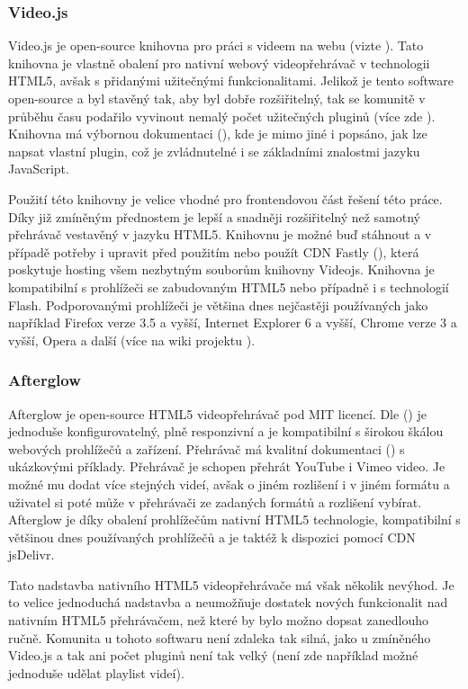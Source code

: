 \documentclass[thesis=M,czech]{FITthesis}[2012/06/26]
\begin{document}
\subsubsection{Video.js} \label{subsubsec:analyza_reseni_videojs}
Video.js je open-source knihovna pro práci s videem na webu (vizte \cite{videojs_web}). Tato knihovna je vlastně obalení pro nativní webový videopřehrávač v technologii HTML5, avšak s přidanými užitečnými funkcionalitami. Jelikož je tento software open-source a byl stavěný tak, aby byl dobře rozšiřitelný, tak se komunitě v průběhu času podařilo vyvinout nemalý počet užitečných pluginů (více zde \cite{videojs_plg}). Knihovna má výbornou dokumentaci (\cite{videojs_doc}), kde je mimo jiné i popsáno, jak lze napsat vlastní plugin, což je zvládnutelné i se základními znalostmi jazyku JavaScript. 
	
	Použití této knihovny je velice vhodné pro frontendovou část řešení této práce. Díky již zmíněným přednostem je lepší a snadněji rozšiřitelný než samotný přehrávač vestavěný v jazyku HTML5. Knihovnu je možné buď stáhnout a v případě potřeby i upravit před použitím nebo použít CDN Fastly (\cite{fastly_cdn}), která poskytuje hosting všem nezbytným souborům knihovny Videojs. Knihovna je kompatibilní s prohlížeči se zabudovaným HTML5 nebo případně i s technologií Flash. Podporovanými prohlížeči je většina dnes nejčastěji používaných jako například Firefox verze 3.5 a vyšší, Internet Explorer 6 a vyšší, Chrome verze 3 a vyšší, Opera a další (více na wiki projektu \cite{videojs_wiki}).

\subsubsection{Afterglow} \label{subsubsec:analyza_reseni_afterglow}
Afterglow je open-source HTML5 videopřehrávač pod MIT licencí. Dle (\cite{afterglow}) je jednoduše konfigurovatelný, plně responzivní a je kompatibilní s širokou škálou webových prohlížečů a zařízení. Přehrávač má kvalitní dokumentaci (\cite{afterglow_doc}) s ukázkovými příklady. Přehrávač je schopen přehrát YouTube i Vimeo video. Je možné mu dodat více stejných videí, avšak o jiném rozlišení i v jiném formátu a uživatel si poté může v přehrávači ze zadaných formátů a rozlišení vybírat. Afterglow je díky obalení prohlížečům nativní HTML5 technologie, kompatibilní s většinou dnes používaných prohlížečů a je taktéž k dispozici pomocí CDN jsDelivr.
	
	Tato nadstavba nativního HTML5 videopřehrávače má však několik nevýhod. Je to velice jednoduchá nadstavba a neumožňuje dostatek nových funkcionalit nad nativním HTML5 přehrávačem, než které by bylo možno dopsat zanedlouho ručně. Komunita u tohoto softwaru není zdaleka tak silná, jako u zmíněného Video.js a tak ani počet pluginů není tak velký (není zde například možné jednoduše udělat playlist videí).
\end{document}
